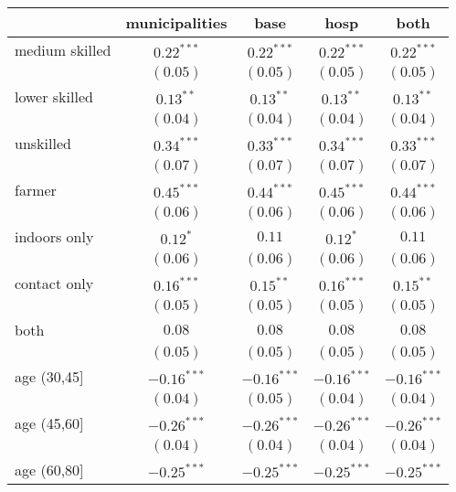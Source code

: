 
\begin{table}
\begin{center}
\begin{tabular}{l c c c c}
\hline
 & municipalities & base & hosp & both \\
\hline
medium skilled     & $0.22^{***}$  & $0.22^{***}$  & $0.22^{***}$  & $0.22^{***}$  \\
                   & $(0.05)$      & $(0.05)$      & $(0.05)$      & $(0.05)$      \\
lower skilled      & $0.13^{**}$   & $0.13^{**}$   & $0.13^{**}$   & $0.13^{**}$   \\
                   & $(0.04)$      & $(0.04)$      & $(0.04)$      & $(0.04)$      \\
unskilled          & $0.34^{***}$  & $0.33^{***}$  & $0.34^{***}$  & $0.33^{***}$  \\
                   & $(0.07)$      & $(0.07)$      & $(0.07)$      & $(0.07)$      \\
farmer             & $0.45^{***}$  & $0.44^{***}$  & $0.45^{***}$  & $0.44^{***}$  \\
                   & $(0.06)$      & $(0.06)$      & $(0.06)$      & $(0.06)$      \\
indoors only       & $0.12^{*}$    & $0.11$        & $0.12^{*}$    & $0.11$        \\
                   & $(0.06)$      & $(0.06)$      & $(0.06)$      & $(0.06)$      \\
contact only       & $0.16^{***}$  & $0.15^{**}$   & $0.16^{***}$  & $0.15^{**}$   \\
                   & $(0.05)$      & $(0.05)$      & $(0.05)$      & $(0.05)$      \\
both               & $0.08$        & $0.08$        & $0.08$        & $0.08$        \\
                   & $(0.05)$      & $(0.05)$      & $(0.05)$      & $(0.05)$      \\
age (30,45]        & $-0.16^{***}$ & $-0.16^{***}$ & $-0.16^{***}$ & $-0.16^{***}$ \\
                   & $(0.04)$      & $(0.05)$      & $(0.04)$      & $(0.04)$      \\
age (45,60]        & $-0.26^{***}$ & $-0.26^{***}$ & $-0.26^{***}$ & $-0.26^{***}$ \\
                   & $(0.04)$      & $(0.04)$      & $(0.04)$      & $(0.04)$      \\
age (60,80]        & $-0.25^{***}$ & $-0.25^{***}$ & $-0.25^{***}$ & $-0.25^{***}$ \\

\end{tabular}
\end{center}
\end{table}
